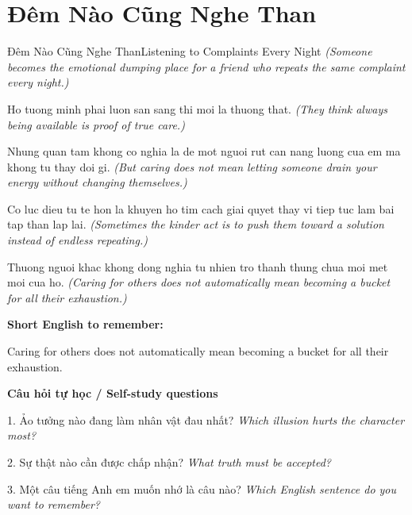 \section{Đêm Nào Cũng Nghe Than}
\begin{truyen}{Đêm Nào Cũng Nghe Than}{Listening to Complaints Every Night}
\textit{(Someone becomes the emotional dumping place for a friend who repeats the same complaint every night.)}

Ho tuong minh phai luon san sang thi moi la thuong that.
\textit{(They think always being available is proof of true care.)}

Nhung quan tam khong co nghia la de mot nguoi rut can nang luong cua em ma khong tu thay doi gi.
\textit{(But caring does not mean letting someone drain your energy without changing themselves.)}

Co luc dieu tu te hon la khuyen ho tim cach giai quyet thay vi tiep tuc lam bai tap than lap lai.
\textit{(Sometimes the kinder act is to push them toward a solution instead of endless repeating.)}

\end{truyen}

\begin{baihoc}
Thuong nguoi khac khong dong nghia tu nhien tro thanh thung chua moi met moi cua ho.
\textit{(Caring for others does not automatically mean becoming a bucket for all their exhaustion.)}
\end{baihoc}

\begin{ghinhoanh}
\textbf{Short English to remember:}

Caring for others does not automatically mean becoming a bucket for all their exhaustion.

\end{ghinhoanh}

\begin{tuhocnhanh}
\textbf{Câu hỏi tự học / Self-study questions}

1. Ảo tưởng nào đang làm nhân vật đau nhất? \textit{Which illusion hurts the character most?}

2. Sự thật nào cần được chấp nhận? \textit{What truth must be accepted?}

3. Một câu tiếng Anh em muốn nhớ là câu nào? \textit{Which English sentence do you want to remember?}
\end{tuhocnhanh}
\ngancach

